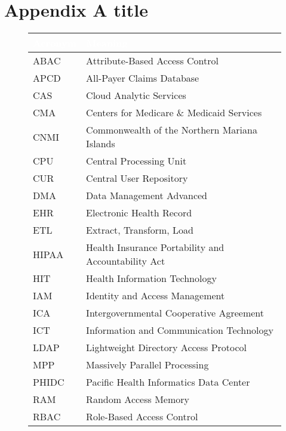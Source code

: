 \section{Appendix A title} \label{section: appendix A title}

\begin{figure}[H]
\begin{center}
    \renewcommand{\arraystretch}{1.5}
    \begin{tabular}{|>{\raggedright\arraybackslash}l 
                    |>{\raggedright\arraybackslash}l 
                    |}
    \hline
    \rowcolor[HTML]{196fb4}\centering\textcolor{white}{\large Acronym} 
                            & \centering\textcolor{white}{\large Meaning} 
                            \tabularnewline 
    \hline
    ABAC & Attribute-Based Access Control\\\hline
    APCD & All-Payer Claims Database\\\hline
    CAS & Cloud Analytic Services\\\hline
    CMA & Centers for Medicare \& Medicaid Services\\\hline
    CNMI & Commonwealth of the Northern Mariana Islands\\\hline
    CPU & Central Processing Unit\\\hline
    CUR & Central User Repository\\\hline
    DMA & Data Management Advanced\\\hline
    EHR & Electronic Health Record\\\hline
    ETL & Extract, Transform, Load\\\hline
    HIPAA & Health Insurance Portability and Accountability Act\\\hline
    HIT & Health Information Technology\\\hline
    IAM & Identity and Access Management\\\hline
    ICA & Intergovernmental Cooperative Agreement\\\hline
    ICT & Information and Communication Technology\\\hline
    LDAP & Lightweight Directory Access Protocol\\\hline
    MPP & Massively Parallel Processing\\\hline
    PHIDC & Pacific Health Informatics Data Center\\\hline
    RAM & Random Access Memory\\\hline
    RBAC & Role-Based Access Control\\\hline

\end{tabular}
\end{center}
\end{figure}
